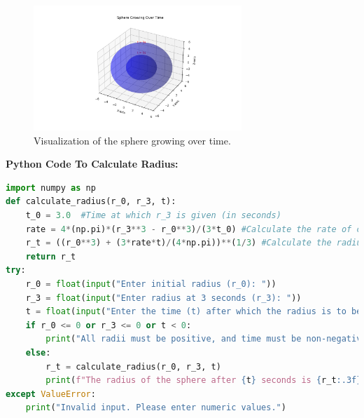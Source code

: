 \documentclass[journal]{IEEEtran}
\numberwithin{equation}{enumi}
\numberwithin{figure}{enumi}
\begin{document}
\begin{figure}[H]
    \centering
    \includegraphics[width=0.7\textwidth]{figs/growing_sphere.png}
    \caption{Visualization of the sphere growing over time.}
\end{figure}

\textbf{Python Code To Calculate Radius:}
\begin{lstlisting}[language=Python]
import numpy as np
def calculate_radius(r_0, r_3, t):
    t_0 = 3.0  #Time at which r_3 is given (in seconds) 
    rate = 4*(np.pi)*(r_3**3 - r_0**3)/(3*t_0) #Calculate the rate of change of volume
    r_t = ((r_0**3) + (3*rate*t)/(4*np.pi))**(1/3) #Calculate the radius at time t
    return r_t
try:
    r_0 = float(input("Enter initial radius (r_0): "))
    r_3 = float(input("Enter radius at 3 seconds (r_3): "))
    t = float(input("Enter the time (t) after which the radius is to be found: "))
    if r_0 <= 0 or r_3 <= 0 or t < 0:
        print("All radii must be positive, and time must be non-negative.")
    else:
        r_t = calculate_radius(r_0, r_3, t)
        print(f"The radius of the sphere after {t} seconds is {r_t:.3f} units.")
except ValueError:
    print("Invalid input. Please enter numeric values.")
\end{lstlisting}
\end{document}
